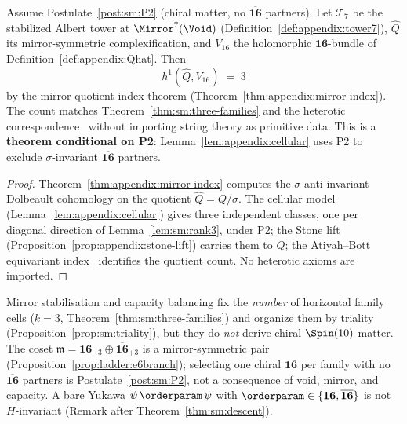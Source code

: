 \begin{theorem}\label{thm:sm:h1}
Assume Postulate~\ref{post:sm:P2} (chiral matter, no $\overline{\mathbf{16}}$
partners). Let $\mathcal{T}_7$ be the stabilized Albert tower at
$\Mirror^7(\Void)$ (Definition~\ref{def:appendix:tower7}), $\hat Q$ its
mirror-symmetric complexification, and $V_{16}$ the holomorphic
$\mathbf{16}$-bundle of Definition~\ref{def:appendix:Qhat}. Then
\begin{equation}\label{eq:sm:h1}
  h^1(\hat Q,V_{16}) \;=\; 3
\end{equation}
by the mirror-quotient index theorem (Theorem~\ref{thm:appendix:mirror-index}).
The count matches Theorem~\ref{thm:sm:three-families} and the heterotic
correspondence~\cite{Witten1985} without importing string theory as primitive
data. This is a \textbf{theorem conditional on P2}: Lemma~\ref{lem:appendix:cellular}
uses P2 to exclude $\sigma$-invariant $\overline{\mathbf{16}}$ partners.
\end{theorem}

\begin{proof}
Theorem~\ref{thm:appendix:mirror-index} computes the $\sigma$-anti-invariant
Dolbeault cohomology on the quotient $\hat Q=Q/\sigma$. The cellular model
(Lemma~\ref{lem:appendix:cellular}) gives three independent classes, one per
diagonal direction of Lemma~\ref{lem:sm:rank3}, under P2; the Stone lift
(Proposition~\ref{prop:appendix:stone-lift}) carries them to $Q$; the
Atiyah--Bott equivariant index~\cite{AtiyahBott1966} identifies the quotient
count. No heterotic axioms are imported.
\end{proof}

\begin{proposition}
\label{prop:sm:p2-nogo}
Mirror stabilisation and capacity balancing fix the \emph{number} of
horizontal family cells ($k=3$, Theorem~\ref{thm:sm:three-families}) and
organize them by triality (Proposition~\ref{prop:sm:triality}), but they do
\emph{not} derive chiral $\Spin(10)$ matter. The coset
$\mathfrak{m}=\mathbf{16}_{-3}\oplus\overline{\mathbf{16}}_{+3}$ is a
mirror-symmetric pair (Proposition~\ref{prop:ladder:e6branch}); selecting
one chiral $\mathbf{16}$ per family with no $\overline{\mathbf{16}}$
partners is Postulate~\ref{post:sm:P2}, not a consequence of void, mirror,
and capacity. A bare Yukawa $\bar\psi\,\orderparam\,\psi$ with
$\orderparam\in\{\mathbf{16},\overline{\mathbf{16}}\}$ is not
$H$-invariant (Remark after Theorem~\ref{thm:sm:descent}).
\end{proposition}

